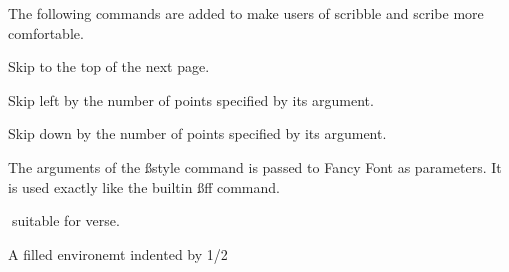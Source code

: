 The following commands are added to make users of scribble and
scribe more comfortable.

{\describe

 Skip to the top of the next page.

 Skip left by the number of points specified by
its argument.

 Skip down by the number of points specified by
its argument.

 The arguments of the {\ss style} command is passed
to {\FF Fancy Font} as parameters. It is used exactly like the
builtin {\ss ff} command.
}			%
suitable for verse.

 A filled environemt indented by 1/2 